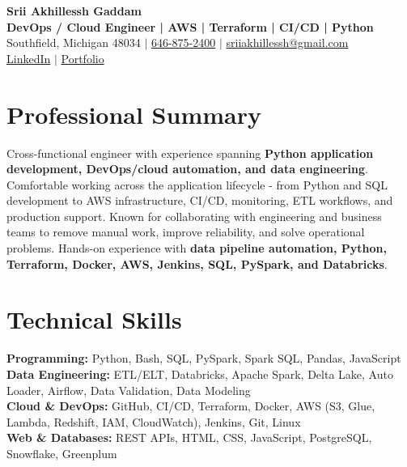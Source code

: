 \documentclass[letterpaper,10pt]{article}
\begin{document}
\fontsize{9.35pt}{10.45pt}\selectfont

\begin{center}
    {\LARGE \textbf{Srii Akhillessh Gaddam}} \\[-1pt]
    \textbf{DevOps / Cloud Engineer | AWS | Terraform | CI/CD | Python} \\[2pt]
    Southfield, Michigan 48034 $|$
    \href{tel:6468752400}{646-875-2400} $|$
    \href{mailto:sriiakhillessh@gmail.com}{sriiakhillessh@gmail.com} \\[1pt]
    \href{https://www.linkedin.com/in/srii-akhiilessh-gaddam-b48668191/}{LinkedIn} $|$
    \href{https://sriiakhillesshg.github.io/portfolio/}{Portfolio}
\end{center}
\vspace{-8pt}

\section{Professional Summary}
\small{Cross-functional engineer with experience spanning \textbf{Python application development, DevOps/cloud automation, and data engineering}. Comfortable working across the application lifecycle - from Python and SQL development to AWS infrastructure, CI/CD, monitoring, ETL workflows, and production support. Known for collaborating with engineering and business teams to remove manual work, improve reliability, and solve operational problems. Hands-on experience with \textbf{data pipeline automation, Python, Terraform, Docker, AWS, Jenkins, SQL, PySpark, and Databricks}.}

\section{Technical Skills}
\small{
\textbf{Programming:} Python, Bash, SQL, PySpark, Spark SQL, Pandas, JavaScript \\
\textbf{Data Engineering:} ETL/ELT, Databricks, Apache Spark, Delta Lake, Auto Loader, Airflow, Data Validation, Data Modeling \\
\textbf{Cloud \& DevOps:} GitHub, CI/CD, Terraform, Docker, AWS (S3, Glue, Lambda, Redshift, IAM, CloudWatch), Jenkins, Git, Linux \\
\textbf{Web \& Databases:} REST APIs, HTML, CSS, JavaScript, PostgreSQL, Snowflake, Greenplum
}
\end{document}
